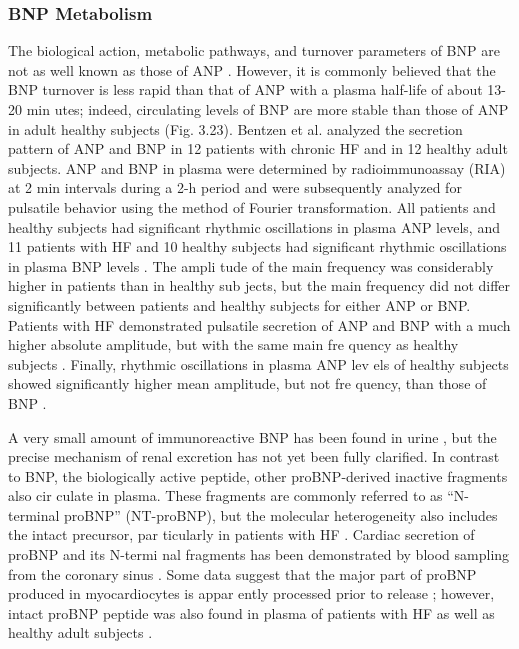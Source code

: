 \documentclass[14pt,a4paper,onecolumn]{extarticle}
\begin{document}
\subsubsection{BNP Metabolism
}
The biological action, metabolic pathways, and turnover parameters of BNP are not as well known as those of ANP \citep{14}. However, it is commonly believed that the BNP turnover is less rapid than that of ANP with a plasma half-life of about 13-20 min utes; indeed, circulating levels of BNP are more stable than those of ANP in adult healthy subjects (Fig. 3.23). Bentzen et al. \citep{197} analyzed the secretion pattern of ANP and BNP in 12 patients with chronic HF and in 12 healthy adult subjects. ANP and BNP in plasma were determined by radioimmunoassay (RIA) at 2 min intervals during a 2-h period and were subsequently analyzed for pulsatile behavior using the method of Fourier transformation. All patients and healthy subjects had significant rhythmic oscillations in plasma ANP levels, and 11 patients with HF and 10 healthy subjects had significant rhythmic oscillations in plasma BNP levels \citep{197}. The ampli tude of the main frequency was considerably higher in patients than in healthy sub jects, but the main frequency did not differ significantly between patients and healthy subjects for either ANP or BNP. Patients with HF demonstrated pulsatile secretion of ANP and BNP with a much higher absolute amplitude, but with the same main fre quency as healthy subjects \citep{197}. Finally, rhythmic oscillations in plasma ANP lev els of healthy subjects showed significantly higher mean amplitude, but not fre quency, than those of BNP \citep{197}.

A very small amount of immunoreactive BNP has been found in urine \citep{202} \citep{203}, but the precise mechanism of renal excretion has not yet been fully clarified. In contrast to BNP, the biologically active peptide, other proBNP-derived inactive fragments also cir culate in plasma. These fragments are commonly referred to as “N-terminal proBNP” (NT-proBNP), but the molecular heterogeneity also includes the intact precursor, par ticularly in patients with HF \citep{14} \citep{204}. Cardiac secretion of proBNP and its N-termi nal fragments has been demonstrated by blood sampling from the coronary sinus \citep{205}.  Some data suggest that the major part of proBNP produced in myocardiocytes is appar ently processed prior to release \citep{14}; however, intact proBNP peptide was also found in plasma of patients with HF as well as healthy adult subjects \citep{14} \citep{205} \citep{206}.
\end{document}
